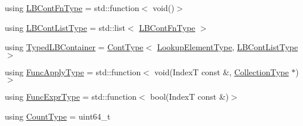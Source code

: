 \begin{DoxyCompactItemize}
\item 
using \hyperlink{structvt_1_1vrt_1_1collection_1_1_holder_a01812f8ee06d3a67e1a9aa2765989913}{L\+B\+Cont\+Fn\+Type} = std\+::function$<$ void()$>$
\item 
using \hyperlink{structvt_1_1vrt_1_1collection_1_1_holder_af26a59243dd4e1a86d8fcf320a8dc463}{L\+B\+Cont\+List\+Type} = std\+::list$<$ \hyperlink{structvt_1_1vrt_1_1collection_1_1_holder_a01812f8ee06d3a67e1a9aa2765989913}{L\+B\+Cont\+Fn\+Type} $>$
\item 
using \hyperlink{structvt_1_1vrt_1_1collection_1_1_holder_a9738cadcf89ace9c3d0c23990e4f919e}{Typed\+L\+B\+Container} = \hyperlink{structvt_1_1vrt_1_1collection_1_1_holder_ae3bb115b69cf47e14a4e8441cebe9142}{Cont\+Type}$<$ \hyperlink{structvt_1_1vrt_1_1collection_1_1_holder_a3206c3e5eb5d6deb4667409222163b77}{Lookup\+Element\+Type}, \hyperlink{structvt_1_1vrt_1_1collection_1_1_holder_af26a59243dd4e1a86d8fcf320a8dc463}{L\+B\+Cont\+List\+Type} $>$
\item 
using \hyperlink{structvt_1_1vrt_1_1collection_1_1_holder_a26e20d23447e935e218a07ffd638706d}{Func\+Apply\+Type} = std\+::function$<$ void(IndexT const  \&, \hyperlink{structvt_1_1vrt_1_1collection_1_1_holder_a38b4a4bfc4408cf28918c32433c80aac}{Collection\+Type} $\ast$)$>$
\item 
using \hyperlink{structvt_1_1vrt_1_1collection_1_1_holder_a5c28963c09fd935028444c5a09fada2d}{Func\+Expr\+Type} = std\+::function$<$ bool(IndexT const  \&)$>$
\item 
using \hyperlink{structvt_1_1vrt_1_1collection_1_1_holder_a3251a556ac19fc7dc4d0bd388cfaedeb}{Count\+Type} = uint64\+\_\+t
\end{DoxyCompactItemize}
